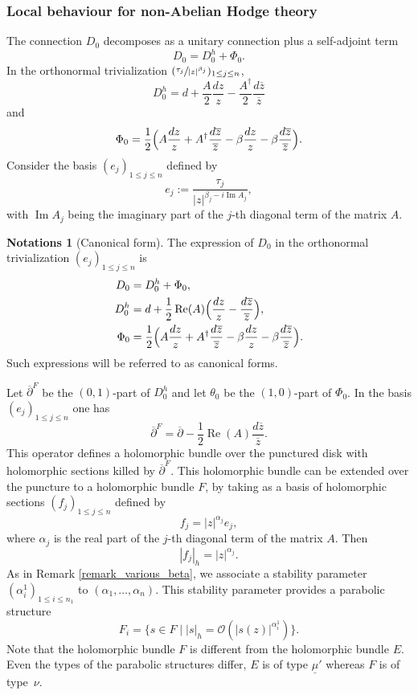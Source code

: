 \documentclass[11pt]{article}
\theoremstyle{definition}
\newtheorem{notations}[definition]{Notations}
\theoremstyle{plain}
\DeclareMathOperator{\Imm}{Im}
\DeclareMathOperator{\Ree}{Re}
\newcommand{\drond}{\overline{\partial}}
\begin{document}
\subsubsection{Local behaviour for non-Abelian Hodge theory}\label{subsection_local_naht}
The connection $D_0$ decomposes as a unitary connection plus a self-adjoint term
\[
D_0= D_0^h + \Phi_0.
\]
In the orthonormal trivialization $(\sfrac{\tau_j}{|z|^{\beta_j }})_{1\le j \le n}$,
\[
D_0^h = d + \frac{A}{2} \frac{d z}{z} - \frac{A^{\dagger}}{2} \frac{d\overline{z}}{\overline{z}}
\]
and
\[
\Phi_0 = \frac{1}{2} \Bigl(A\frac{d z}{z} + A^{\dagger}\frac{d\overline{z}}{\overline{z}} - \beta \frac{d z}{z} - \beta \frac{d \overline{z}}{\overline{z}}\Bigr).
\]
Consider the basis $(e_j)_{1\le j \le n} $ defined by
\[
e_j := \frac{\tau_j}{\left|z\right|^{\beta_j- i \Imm A_j}},
\]
with $\Imm A_j$ being the imaginary part of the $j$-th diagonal term of the matrix $A$.
\begin{notations}[Canonical form]\label{notations_canonical_form}
The expression of $D_0$ in the orthonormal trivialization $(e_j)_{1\le j\le n}$ is
\begin{align*}
D_0 &= D_0^h + \Phi_0,\\
D_0^h &= d +\frac{1}{2} \Ree (A) \Bigl(\frac{d z}{z}- \frac{d\overline{z}}{\overline{z}}\Bigr),\\
\Phi_0 &= \frac{1}{2} \Bigl(A\frac{d z}{z} + A^{\dagger}\frac{d\overline{z}}{\overline{z}} - \beta \frac{d z}{z} - \beta \frac{d \overline{z}}{\overline{z}}\Bigr).
\end{align*}
Such expressions will be referred to as canonical forms.
\end{notations}
Let $\overline{\partial}^F$ be the $(0,1)$-part of $D_0^h$ and let $\theta_0$ be the $(1,0)$-part of $\Phi_0$. In the basis $(e_j)_{1\le j \le n} $ one has
\[
\overline{\partial}^F = \drond - \frac{1}{2} \Ree (A) \frac{d\overline{z}}{\overline{z}}.
\]
This operator defines a holomorphic bundle over the punctured disk with holomorphic sections killed by $\drond^F$. This holomorphic bundle can be extended over the puncture to a holomorphic bundle $F$, by taking as a basis of holomorphic sections $(f_j)_{1\le j \le n}$ defined by
\[
f_j = |z|^{\alpha_j} e_j,
\]
where $\alpha_j$ is the real part of the $j$-th diagonal term of the matrix $A$. Then
\[
|f_j|_h = \left|z\right|^{\alpha_j}.
\]
As in Remark \ref{remark_various_beta}, we associate a stability parameter $(\alpha^1_i)_{1\le i \le n_1}$ to $(\alpha_1,\dots,\alpha_n)$.
This stability parameter provides a parabolic structure
\[
F_i =\lbrace s\in F\mid |s|_h=\mathcal{O}(|s(z)|^{\alpha_i^1})\rbrace.
\]
Note that the holomorphic bundle $F$ is different from the holomorphic bundle $E$. Even the types of the parabolic structures differ, $E$ is of type $\underline{\mu}'$ whereas $F$ is of type~$\nu$.
\end{document}
